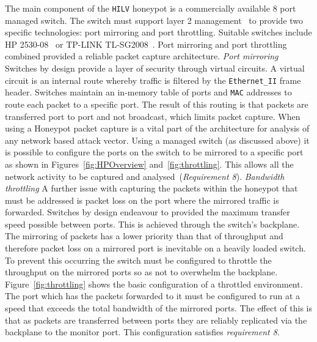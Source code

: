 The main component of the \texttt{HILV} honeypot is a commercially available 8
port managed switch. The switch must support layer 2 management~\cite{ST:98} to
provide two specific technologies: port mirroring and port throttling. Suitable
switches include HP 2530-08~\cite{HP:17} or TP-LINK TL-SG2008~\cite{TP:17}.
Port mirroring and port throttling combined provided a reliable packet capture
architecture.  \newline\newline \noindent\textit{Port mirroring}
\newline\newline Switches by design provide a layer of security through virtual
circuits. A virtual circuit is an internal route whereby traffic is filtered by
the \texttt{Ethernet\_II} frame header. Switches maintain an in-memory table of
ports and \texttt{MAC} addresses to route each packet to a specific port. The
result of this routing is that packets are transferred port to port and not
broadcast, which limits packet capture. When using a Honeypot packet capture is
a vital part of the architecture for analysis of any network based attack
vector. Using a managed switch (as discussed above) it is possible to configure
the ports on the switch to be mirrored to a specific port as shown in
Figures~\ref{fig:HPOverview} and~\ref{fig:throttling}. This allows all the
network activity to be captured and analysed~(\emph{Requirement 8}).
\newline\newline \noindent \textit{Bandwidth throttling} \newline\newline A
further issue with capturing the packets within the honeypot that must be
addressed is packet loss on the port where the mirrored traffic is forwarded.
Switches by design endeavour to provided the maximum transfer speed possible
between ports. This is achieved through the switch's backplane. The mirroring
of packets has a lower priority than that of throughput and therefore packet
loss on a mirrored port is inevitable on a heavily loaded switch. To prevent
this occurring the switch must be configured to throttle the throughput on the
mirrored ports so as not to overwhelm the backplane.
Figure~\ref{fig:throttling} shows the basic configuration of a throttled
environment. The port which has the packets forwarded to it must be configured
to run at a speed that exceeds the total bandwidth of the mirrored ports. The
effect of this is that as packets are transferred between ports they are
reliably replicated via the backplane to the monitor port. This configuration
satisfies \emph{requirement 8}.

